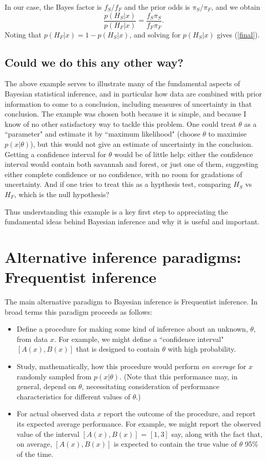 \documentclass[times,11pt]{article}
\def\s{\mbox{savannah}}
\def\f{\mbox{forest}}
\def\ffA{f_F}
\def\fsA{f_S}
\def\pif{\pi_F}
\def\pis{\pi_S}
\def\Hf{H_F}
\def\Hs{H_S}
\def\data{x}
\begin{document}
In our case, the Bayes factor is $\fsA/\ffA$ and the prior odds is $\pis/\pif$, and we obtain
\begin{equation}
\frac{p(\Hs | \data)}{p(\Hf | \data)} = \frac{\fsA\pis}{\ffA \pif}.
\end{equation}
Noting that $p(\Hf|\data) = 1-p(\Hs|\data)$, and solving for $p(\Hs |\data)$ gives (\ref{final}).

\subsection*{Could we do this any other way?}

The above example serves to illustrate many of the fundamental aspects of Bayesian statistical inference, and in particular how data are combined with prior information to come to a conclusion, including measures of uncertainty in that conclusion. The example was chosen both because it is simple, and because
I know of no other satisfactory way to tackle this problem. One could treat $\theta$ as a ``parameter" and estimate it by ``maximum likelihood" (choose $\theta$ to maximise $p(\data|\theta)$), but this would not give an estimate of uncertainty in the conclusion. Getting a confidence interval for $\theta$ would be of little help: either the confidence interval would contain both $\s$ and $\f$, or just one of them, suggesting either complete confidence or no confidence, with no room for gradations of uncertainty. And if one tries to treat this as a hypthesis test, comparing $\Hs$ vs $\Hf$, which is the null hypothesis? 

Thus understanding this example is a key first step to appreciating
the fundamental ideas behind Bayesian inference and why it is useful and important. 


\section*{Alternative inference paradigms: Frequentist inference}

The main alternative paradigm to Bayesian inference is Frequentist inference.
In broad terms this paradigm proceeds as follows:
\begin{itemize}
\item Define a procedure for making some kind of inference about an unknown, $\theta$, from data $\data$. 
For example, we might define a ``confidence interval" $[A(\data),B(\data)]$ that is designed to contain $\theta$ with high probability.
\item Study, mathematically, how this procedure would perform {\it on average} for $\data$ randomly sampled from $p(\data|\theta)$. (Note that this performance 
may, in general, depend on $\theta$, necessitating consideration of performance characteristics for different values of $\theta$.)
\item For actual observed data $\data$ report the outcome of the procedure, and report its expected average performance.
For example, we might report the observed value of the interval $[A(\data),B(\data)]$ = $[1,3]$ say, along with the fact that, on average, $[A(\data),B(\data)]$
is expected to contain the true value of $\theta$ 95\% of the time.
\end{itemize}
\end{document}
